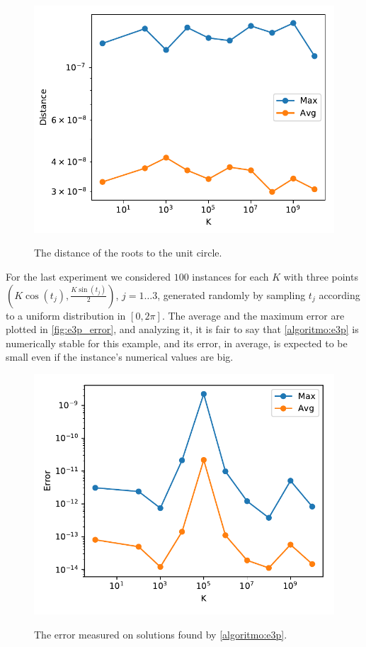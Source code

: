 \begin{figure}
	\centering
	\caption{The distance of the roots to the unit circle.}
	\includegraphics[scale=.8]{tex/figures/e3p_known_sols2}
	\fautor
	\label{fig:e3p_known_sols2}
\end{figure}
For the last experiment we considered $100$ instances for each $K$ with three points $(K\cos(t_j), \frac{K\sin{(t_j)}}{2})$, $j=1\dots3$, generated randomly by sampling $t_j$ according to a uniform distribution in $[0, 2\pi]$. The average and the maximum error are plotted in \autoref{fig:e3p_error}, and analyzing it, it is fair to say that \autoref{algoritmo:e3p} is numerically stable for this example, and its error, in average, is expected to be small even if the instance's numerical values are big.
\begin{figure}
	\centering
	\caption{The error measured on solutions found by \autoref{algoritmo:e3p}.}
	\includegraphics[scale=.8]{tex/figures/e3p_error}
	\fautor
	\label{fig:e3p_error}
\end{figure}
